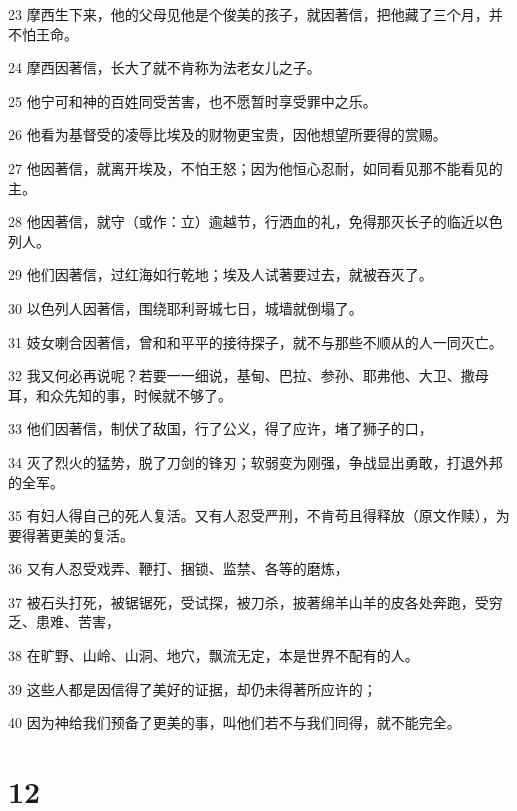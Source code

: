 \par 23 摩西生下来，他的父母见他是个俊美的孩子，就因著信，把他藏了三个月，并不怕王命。
\par 24 摩西因著信，长大了就不肯称为法老女儿之子。
\par 25 他宁可和神的百姓同受苦害，也不愿暂时享受罪中之乐。
\par 26 他看为基督受的凌辱比埃及的财物更宝贵，因他想望所要得的赏赐。
\par 27 他因著信，就离开埃及，不怕王怒；因为他恒心忍耐，如同看见那不能看见的主。
\par 28 他因著信，就守（或作：立）逾越节，行洒血的礼，免得那灭长子的临近以色列人。
\par 29 他们因著信，过红海如行乾地；埃及人试著要过去，就被吞灭了。
\par 30 以色列人因著信，围绕耶利哥城七日，城墙就倒塌了。
\par 31 妓女喇合因著信，曾和和平平的接待探子，就不与那些不顺从的人一同灭亡。
\par 32 我又何必再说呢？若要一一细说，基甸、巴拉、参孙、耶弗他、大卫、撒母耳，和众先知的事，时候就不够了。
\par 33 他们因著信，制伏了敌国，行了公义，得了应许，堵了狮子的口，
\par 34 灭了烈火的猛势，脱了刀剑的锋刃；软弱变为刚强，争战显出勇敢，打退外邦的全军。
\par 35 有妇人得自己的死人复活。又有人忍受严刑，不肯苟且得释放（原文作赎），为要得著更美的复活。
\par 36 又有人忍受戏弄、鞭打、捆锁、监禁、各等的磨炼，
\par 37 被石头打死，被锯锯死，受试探，被刀杀，披著绵羊山羊的皮各处奔跑，受穷乏、患难、苦害，
\par 38 在旷野、山岭、山洞、地穴，飘流无定，本是世界不配有的人。
\par 39 这些人都是因信得了美好的证据，却仍未得著所应许的；
\par 40 因为神给我们预备了更美的事，叫他们若不与我们同得，就不能完全。

\chapter{12}

